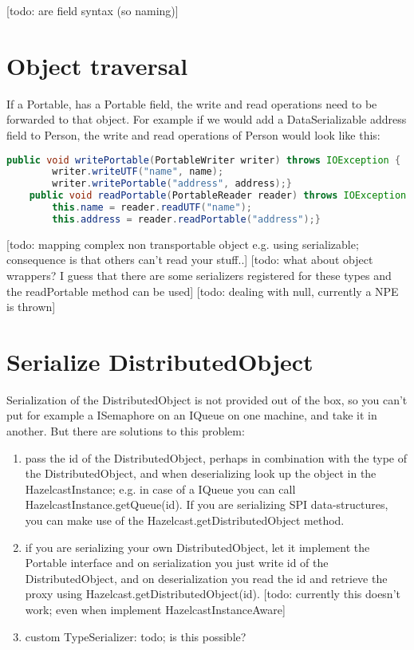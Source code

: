 [todo: are field syntax (so naming)]

\section{Object traversal}
If a Portable, has a Portable field, the write and read operations need to be forwarded to that object. For example if we would add a DataSerializable address field to Person, the write and read operations of Person would look like this:
\begin{lstlisting}[language=java]
    public void writePortable(PortableWriter writer) throws IOException {
        writer.writeUTF("name", name);
        writer.writePortable("address", address);}
    public void readPortable(PortableReader reader) throws IOException {
        this.name = reader.readUTF("name");
        this.address = reader.readPortable("address");}
\end{lstlisting}
[todo: mapping complex non transportable object e.g. using serializable; consequence is that others can't read your stuff..]
[todo: what about object wrappers? I guess that there are some serializers registered for these types and the readPortable method can be used]
[todo: dealing with null, currently a NPE is thrown]

\section{Serialize DistributedObject}
Serialization of the DistributedObject is not provided out of the box, so you can't put for example a ISemaphore on an IQueue on one machine, and take it in another. But there are solutions to this problem:
\begin{enumerate}
\item pass the id of the DistributedObject, perhaps in combination with the type of the DistributedObject, and when deserializing look up the object in the HazelcastInstance; e.g. in case of a IQueue you can call HazelcastInstance.getQueue(id). If you are serializing SPI data-structures, you can make use of the Hazelcast.getDistributedObject method.
\item if you are serializing your own DistributedObject, let it implement the Portable interface and on serialization you just write id of the DistributedObject, and on deserialization you read the id and retrieve the proxy using Hazelcast.getDistributedObject(id). [todo: currently this doesn't work; even when implement HazelcastInstanceAware]
\item custom TypeSerializer: todo; is this possible?
\end{enumerate}

